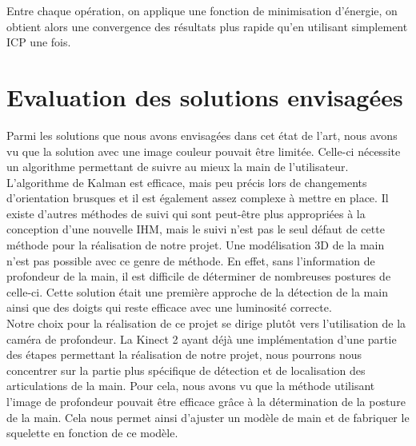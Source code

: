 Entre chaque opération, on applique une fonction de minimisation d'énergie,
on obtient alors une convergence des résultats plus rapide qu'en utilisant simplement ICP une fois.

\section{Evaluation des solutions envisagées}
Parmi les solutions que nous avons envisagées dans cet état de l'art, nous avons vu que la solution avec une 
image couleur pouvait être limitée. Celle-ci nécessite un algorithme permettant de suivre au mieux
la main de l'utilisateur. L'algorithme de Kalman est efficace, mais peu précis lors de changements d'orientation
brusques et il est également assez complexe à mettre en place. Il existe d'autres méthodes de suivi qui sont
peut-être plus appropriées à la conception d'une nouvelle IHM, mais le suivi n'est pas le seul défaut de cette
méthode pour la réalisation de notre projet. Une 
modélisation 3D de la main n'est pas possible avec ce genre de méthode. En effet, sans l'information de 
profondeur de la main, il est difficile de déterminer de nombreuses postures de celle-ci. Cette solution était une première approche de la 
détection de la main ainsi que des doigts qui reste efficace avec une luminosité correcte.\\

Notre choix pour la réalisation de ce projet se dirige plutôt vers l'utilisation de la caméra de profondeur.
La Kinect 2 ayant déjà une implémentation d'une partie des étapes permettant la réalisation de notre projet, nous pourrons
nous concentrer sur la partie plus spécifique de détection et de localisation des articulations de la main. 
Pour cela, nous avons vu que la méthode utilisant l'image de profondeur pouvait être efficace grâce à la 
détermination de la posture de la main. Cela nous permet ainsi d'ajuster un modèle de main et de fabriquer
le squelette en fonction de ce modèle.\\
